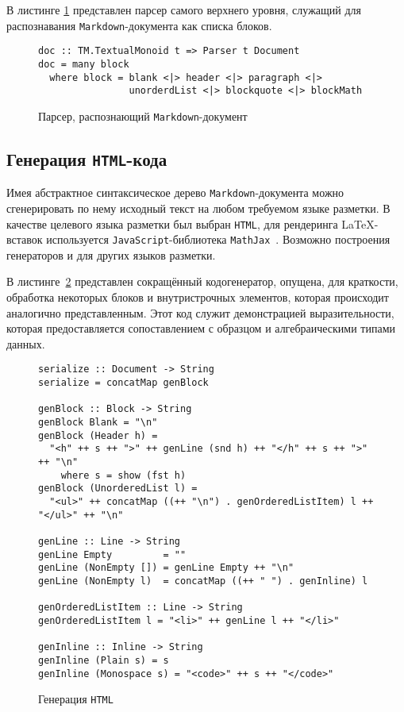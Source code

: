 В листинге \ref{listing:MarkdownDoc} представлен парсер самого верхнего уровня, служащий для распознавания \lstinline{Markdown}-документа как списка блоков.

\begin{figure}[h]
\begin{lstlisting}
doc :: TM.TextualMonoid t => Parser t Document
doc = many block
  where block = blank <|> header <|> paragraph <|>
                unorderdList <|> blockquote <|> blockMath
\end{lstlisting}
\caption{Парсер, распознающий \lstinline{Markdown}-документ}
\label{listing:MarkdownDoc}
\end{figure}

\subsection{Генерация \lstinline{HTML}-кода}

Имея абстрактное синтаксическое дерево \lstinline{Markdown}-документа можно сгенерировать по нему исходный текст на любом требуемом языке разметки. В качестве целевого языка разметки был выбран \lstinline{HTML}, для рендеринга \LaTeX-вставок используется \lstinline{JavaScript}-библиотека \lstinline{MathJax}~\autocite{MathJax}. Возможно построения генераторов и для других языков разметки.

В листинге~\ref{listing:HTMLGen} представлен сокращённый кодогенератор, опущена, для краткости, обработка некоторых блоков и внутристрочных элементов, которая происходит аналогично представленным. Этот код служит демонстрацией выразительности, которая предоставляется сопоставлением с образцом и алгебраическими типами данных.

\begin{figure}[h]
\begin{lstlisting}
serialize :: Document -> String
serialize = concatMap genBlock

genBlock :: Block -> String
genBlock Blank = "\n"
genBlock (Header h) =
  "<h" ++ s ++ ">" ++ genLine (snd h) ++ "</h" ++ s ++ ">" ++ "\n"
    where s = show (fst h)
genBlock (UnorderedList l) =
  "<ul>" ++ concatMap ((++ "\n") . genOrderedListItem) l ++ "</ul>" ++ "\n"

genLine :: Line -> String
genLine Empty         = ""
genLine (NonEmpty []) = genLine Empty ++ "\n"
genLine (NonEmpty l)  = concatMap ((++ " ") . genInline) l

genOrderedListItem :: Line -> String
genOrderedListItem l = "<li>" ++ genLine l ++ "</li>"

genInline :: Inline -> String
genInline (Plain s) = s
genInline (Monospace s) = "<code>" ++ s ++ "</code>"
\end{lstlisting}
\caption{Генерация \lstinline{HTML}}
\label{listing:HTMLGen}
\end{figure}

